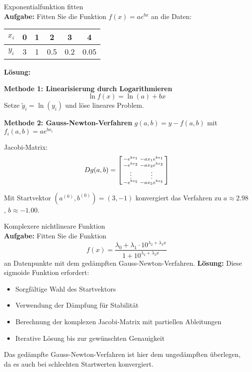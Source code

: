 \begin{example2}{Exponentialfunktion fitten}\\
\textbf{Aufgabe:} Fitten Sie die Funktion $f(x) = ae^{bx}$ an die Daten:
\begin{center}
\begin{tabular}{|c|c|c|c|c|c|}
\hline
$x_i$ & 0 & 1 & 2 & 3 & 4 \\
\hline
$y_i$ & 3 & 1 & 0.5 & 0.2 & 0.05 \\
\hline
\end{tabular}
\end{center}
\tcblower
\textbf{Lösung:}

\textbf{Methode 1: Linearisierung durch Logarithmieren}
$$\ln f(x) = \ln(a) + bx$$
Setze $\tilde{y}_i = \ln(y_i)$ und löse lineares Problem.

\textbf{Methode 2: Gauss-Newton-Verfahren}
$g(a,b) = y - f(a,b)$ mit $f_i(a,b) = ae^{bx_i}$

Jacobi-Matrix:
$$Dg(a,b) = \begin{bsmallmatrix}
-e^{bx_1} & -ax_1 e^{bx_1} \\
-e^{bx_2} & -ax_2 e^{bx_2} \\
\vdots & \vdots \\
-e^{bx_5} & -ax_5 e^{bx_5}
\end{bsmallmatrix}$$

Mit Startvektor $(a^{(0)}, b^{(0)}) = (3, -1)$ konvergiert das Verfahren zu $a \approx 2.98$, $b \approx -1.00$.
\end{example2}

\begin{example2}{Komplexere nichtlineare Funktion}\\
\textbf{Aufgabe:} Fitten Sie die Funktion 
$$f(x) = \frac{\lambda_0 + \lambda_1 \cdot 10^{\lambda_2 + \lambda_3 x}}{1 + 10^{\lambda_2 + \lambda_3 x}}$$
an Datenpunkte mit dem gedämpften Gauss-Newton-Verfahren.
\tcblower
\textbf{Lösung:}
Diese sigmoide Funktion erfordert:
\begin{itemize}
    \item Sorgfältige Wahl des Startvektors
    \item Verwendung der Dämpfung für Stabilität
    \item Berechnung der komplexen Jacobi-Matrix mit partiellen Ableitungen
    \item Iterative Lösung bis zur gewünschten Genauigkeit
\end{itemize}

Das gedämpfte Gauss-Newton-Verfahren ist hier dem ungedämpften überlegen, da es auch bei schlechten Startwerten konvergiert.
\end{example2}

